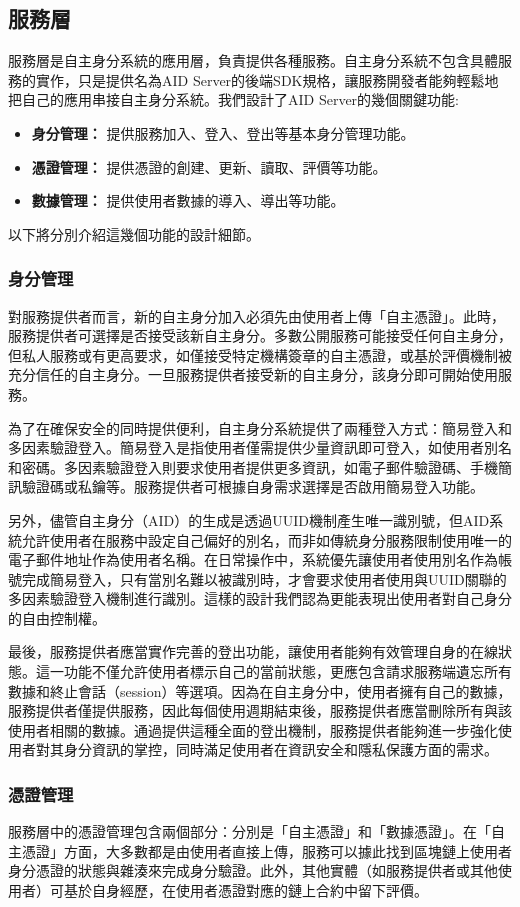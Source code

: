 \subsection{服務層}
服務層是自主身分系統的應用層，負責提供各種服務。自主身分系統不包含具體服務的實作，只是提供名為AID Server的後端SDK規格，讓服務開發者能夠輕鬆地把自己的應用串接自主身分系統。我們設計了AID Server的幾個關鍵功能:
\begin{itemize}
  \item \textbf{身分管理：} 提供服務加入、登入、登出等基本身分管理功能。
  \item \textbf{憑證管理：} 提供憑證的創建、更新、讀取、評價等功能。
  \item \textbf{數據管理：} 提供使用者數據的導入、導出等功能。
\end{itemize}
以下將分別介紹這幾個功能的設計細節。
\subsubsection{身分管理}
對服務提供者而言，新的自主身分加入必須先由使用者上傳「自主憑證」。此時，服務提供者可選擇是否接受該新自主身分。多數公開服務可能接受任何自主身分，但私人服務或有更高要求，如僅接受特定機構簽章的自主憑證，或基於評價機制被充分信任的自主身分。一旦服務提供者接受新的自主身分，該身分即可開始使用服務。

為了在確保安全的同時提供便利，自主身分系統提供了兩種登入方式：簡易登入和多因素驗證登入。簡易登入是指使用者僅需提供少量資訊即可登入，如使用者別名和密碼。多因素驗證登入則要求使用者提供更多資訊，如電子郵件驗證碼、手機簡訊驗證碼或私鑰等。服務提供者可根據自身需求選擇是否啟用簡易登入功能。

另外，儘管自主身分（AID）的生成是透過UUID機制\cite{uuid}產生唯一識別號，但AID系統允許使用者在服務中設定自己偏好的別名，而非如傳統身分服務限制使用唯一的電子郵件地址作為使用者名稱。在日常操作中，系統優先讓使用者使用別名作為帳號完成簡易登入，只有當別名難以被識別時，才會要求使用者使用與UUID關聯的多因素驗證登入機制進行識別。這樣的設計我們認為更能表現出使用者對自己身分的自由控制權。

最後，服務提供者應當實作完善的登出功能，讓使用者能夠有效管理自身的在線狀態。這一功能不僅允許使用者標示自己的當前狀態，更應包含請求服務端遺忘所有數據和終止會話（session）等選項。因為在自主身分中，使用者擁有自己的數據，服務提供者僅提供服務，因此每個使用週期結束後，服務提供者應當刪除所有與該使用者相關的數據。通過提供這種全面的登出機制，服務提供者能夠進一步強化使用者對其身分資訊的掌控，同時滿足使用者在資訊安全和隱私保護方面的需求。
\subsubsection{憑證管理}
服務層中的憑證管理包含兩個部分：分別是「自主憑證」和「數據憑證」。在「自主憑證」方面，大多數都是由使用者直接上傳，服務可以據此找到區塊鏈上使用者身分憑證的狀態與雜湊來完成身分驗證。此外，其他實體（如服務提供者或其他使用者）可基於自身經歷，在使用者憑證對應的鏈上合約中留下評價。

